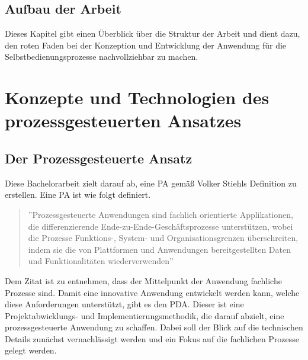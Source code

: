 \subsection{Aufbau der Arbeit}
Dieses Kapitel gibt einen Überblick über die Struktur der Arbeit und dient dazu, den roten Faden bei der Konzeption und Entwicklung der Anwendung für die Selbstbedienungsprozesse nachvollziehbar zu machen.


\section{Konzepte und Technologien des prozessgesteuerten Ansatzes}
\subsection{Der Prozessgesteuerte Ansatz}
Diese Bachelorarbeit zielt darauf ab, eine \ac{PA} gemäß Volker Stiehls Definition zu erstellen. Eine \ac{PA} ist wie folgt definiert.

\begin{quote}
''Prozessgesteuerte Anwendungen sind fachlich orientierte Applikationen, die differenzierende Ende-zu-Ende-Geschäftsprozesse unterstützen, wobei die Prozesse Funktions-, System- und Organisationsgrenzen überschreiten, indem sie die von Plattformen und Anwendungen bereitgestellten Daten und Funktionalitäten wiederverwenden'' \citep[][S. 24]{stiehl_prozessgesteuerte_2013}
\end{quote}

Dem Zitat ist zu entnehmen, dass der Mittelpunkt der Anwendung fachliche Prozesse sind. Damit eine innovative Anwendung entwickelt werden kann, welche diese Anforderungen unterstützt, gibt es den \ac{PDA}. Dieser ist eine Projektabwicklungs- und Implementierungsmethodik, die darauf abzielt, eine prozessgesteuerte Anwendung zu schaffen. Dabei soll der Blick auf die technischen Details zunächst vernachlässigt werden und ein Fokus auf die fachlichen Prozesse gelegt werden. \citep[vgl.][]{stiehl_prozessgesteuerte_2024}

